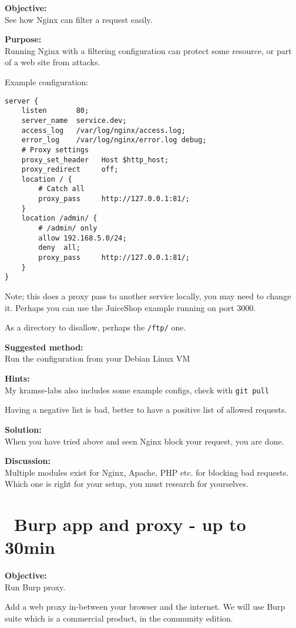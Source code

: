 \documentclass[a4paper,11pt,notitlepage]{report}
\begin{document}
{\bf Objective:}\\
See how Nginx can filter a request easily.


{\bf Purpose:}\\
Running Nginx with a filtering configuration can protect some resource, or part of a web site from attacks.

Example configuration:
\begin{verbatim}
server {
    listen       80;
    server_name  service.dev;
    access_log   /var/log/nginx/access.log;
    error_log    /var/log/nginx/error.log debug;
    # Proxy settings
    proxy_set_header   Host $http_host;
    proxy_redirect     off;
    location / {
        # Catch all
        proxy_pass     http://127.0.0.1:81/;
    }
    location /admin/ {
        # /admin/ only
        allow 192.168.5.0/24;
        deny  all;
        proxy_pass     http://127.0.0.1:81/;
    }
}
\end{verbatim}

Note; this does a proxy pass to another service locally, you may need to change it. Perhaps you can use the JuiceShop example running on port 3000.

As a directory to disallow, perhaps the \verb+/ftp/+ one.

{\bf Suggested method:}\\
Run the configuration from your Debian Linux VM


{\bf Hints:}\\
My kramse-labs also includes some example configs, check with \verb+git pull+

Having a negative list is bad, better to have a positive list of allowed requests.

{\bf Solution:}\\
When you have tried above and seen Nginx block your request, you are done.

{\bf Discussion:}\\
Multiple modules exist for Nginx, Apache, PHP etc. for blocking bad requests.
Which one is right for your setup, you must research for yourselves.


\chapter{\faInfoCircle\ Burp app and proxy - up to 30min}
\label{ex:burp-basic}

{\bf Objective:}\\
Run Burp proxy.

Add a web proxy in-between your browser and the internet. We will use Burp suite which is a commercial product, in the community edition.
\end{document}
